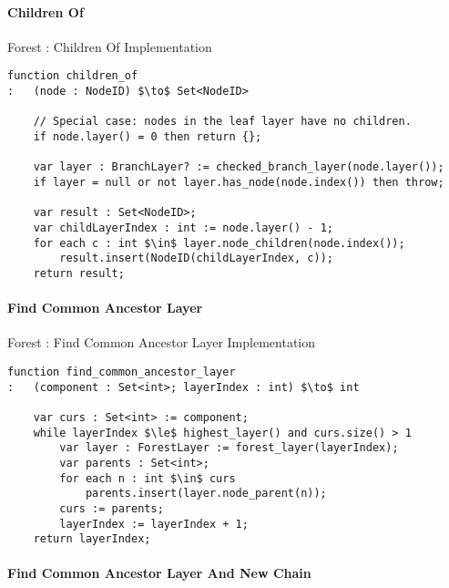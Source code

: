 \paragraph{Children Of}

\begin{stulisting}[H]
\caption{Forest : Children Of Implementation}
\begin{lstlisting}[style=Default]
function children_of
:	(node : NodeID) $\to$ Set<NodeID>

	// Special case: nodes in the leaf layer have no children.
	if node.layer() = 0 then return {};

	var layer : BranchLayer? := checked_branch_layer(node.layer());
	if layer = null or not layer.has_node(node.index()) then throw;

	var result : Set<NodeID>;
	var childLayerIndex : int := node.layer() - 1;
	for each c : int $\in$ layer.node_children(node.index());
		result.insert(NodeID(childLayerIndex, c));
	return result;
\end{lstlisting}
\end{stulisting}

\paragraph{Find Common Ancestor Layer}

\begin{stulisting}[H]
\caption{Forest : Find Common Ancestor Layer Implementation}
\begin{lstlisting}[style=Default]
function find_common_ancestor_layer
:	(component : Set<int>; layerIndex : int) $\to$ int

	var curs : Set<int> := component;
	while layerIndex $\le$ highest_layer() and curs.size() > 1
		var layer : ForestLayer := forest_layer(layerIndex);
		var parents : Set<int>;
		for each n : int $\in$ curs
			parents.insert(layer.node_parent(n));
		curs := parents;
		layerIndex := layerIndex + 1;
	return layerIndex;
\end{lstlisting}
\end{stulisting}

\paragraph{Find Common Ancestor Layer And New Chain}

